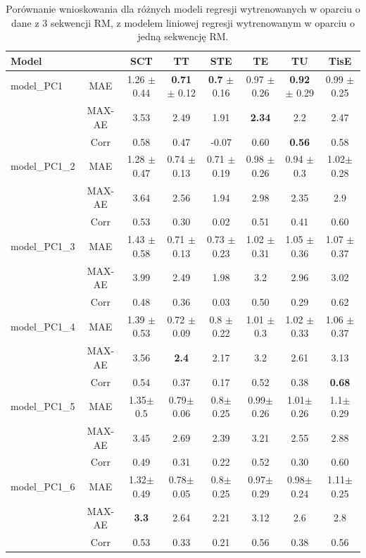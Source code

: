 \begin{table}[h!]
	\caption{Porównanie wnioskowania dla różnych modeli regresji wytrenowanych w oparciu o dane z 3 sekwencji RM, z modelem liniowej regresji wytrenowanym w oparciu o jedną sekwencję RM.}
	\scriptsize
	\begin{center}
		\begin{tabular}{lc||c|c|c|c|c|c}
			\textbf{Model} & & \textbf{SCT} & \textbf{TT} & \textbf{STE} & \textbf{TE} & \textbf{TU} & \textbf{TisE}\\ 
			
			\hline
			model\_PC1 & MAE & 1.26 $\pm$ 0.44 & \textbf{0.71} $\pm$ 0.12 & \textbf{0.7} $\pm$ 0.16 & 0.97 $\pm$ 0.26 & \textbf{0.92} $\pm$ 0.29 & 0.99 $\pm$ 0.25\\
			&MAX-AE &3.53&2.49&1.91&\textbf{2.34}&2.2&2.47\\
			&Corr &0.58&0.47&-0.07&0.60&\textbf{0.56}&0.58\\
			
			\hline
			model\_PC1\_2 & MAE & 1.28 $\pm$ 0.47 & 0.74 $\pm$ 0.13 & 0.71 $\pm$ 0.19 & 0.98 $\pm$ 0.26 & 0.94 $\pm$ 0.3 & 1.02$\pm$ 0.28\\
			&MAX-AE &3.64&2.56&1.94&2.98&2.35&2.9\\
			&Corr &0.53&0.30&0.02&0.51&0.41&0.60\\
			
			\hline
			model\_PC1\_3&MAE & 1.43 $\pm$ 0.58 & 0.71 $\pm$ 0.13 & 0.73 $\pm$ 0.23 & 1.02 $\pm$ 0.31 & 1.05 $\pm$ 0.36 & 1.07 $\pm$ 0.37\\
			&MAX-AE &3.99&2.49&1.98&3.2&2.96&3.02\\
			&Corr &0.48&0.36&0.03&0.50&0.29&0.62\\
			
			\hline
			model\_PC1\_4&MAE & 1.39 $\pm$ 0.53 & 0.72 $\pm$ 0.09 & 0.8 $\pm$ 0.22 & 1.01 $\pm$ 0.3 & 1.02 $\pm$ 0.33 & 1.06 $\pm$ 0.37\\
			&MAX-AE &3.56&\textbf{2.4}&2.17&3.2&2.61&3.13\\
			&Corr &0.54&0.37&0.17&0.52&0.38&\textbf{0.68}\\
			
			\hline
			model\_PC1\_5&MAE & 1.35$\pm$ 0.5 & 0.79$\pm$0.06 &0.8$\pm$0.25 &0.99$\pm$0.26 &1.01$\pm$0.26 &1.1$\pm$0.29\\
			&MAX-AE &3.45&2.69&2.39&3.21&2.55&2.88\\
			&Corr &0.49&0.31&0.22&0.52&0.30&0.60\\
			
			\hline
			model\_PC1\_6&MAE & 1.32$\pm$0.49 & 0.78$\pm$0.05 &0.8$\pm$0.25& 0.97$\pm$0.29 & 0.98$\pm$0.24 &1.11$\pm$0.25\\
			&MAX-AE &\textbf{3.3}&2.64&2.21&3.12&2.6&2.8\\
			&Corr &0.53&0.33&0.21&0.56&0.38&0.56\\
			

\end{tabular}
\end{center}
\end{table}
